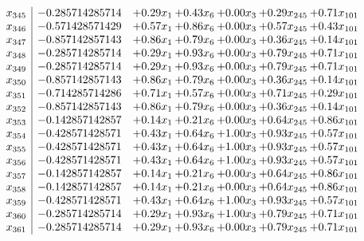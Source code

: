 \documentclass[8pt]{article}
\begin{document}
\[\begin{array}{c| c c@{\hskip 2pt} c@{\hskip 2pt} c@{\hskip 2pt} c@{\hskip 2pt} c@{\hskip 2pt} }
 x_{345}   &  -0.285714285714 & +  0.29 x_{1} & +  0.43 x_{6} & +  0.00 x_{3} & +  0.29 x_{245} & +  0.71 x_{101}\\
 x_{346}   &  -0.571428571429 & +  0.57 x_{1} & +  0.86 x_{6} & +  0.00 x_{3} & +  0.57 x_{245} & +  0.43 x_{101}\\
 x_{347}   &  -0.857142857143 & +  0.86 x_{1} & +  0.79 x_{6} & +  0.00 x_{3} & +  0.36 x_{245} & +  0.14 x_{101}\\
 x_{348}   &  -0.285714285714 & +  0.29 x_{1} & +  0.93 x_{6} & +  0.00 x_{3} & +  0.79 x_{245} & +  0.71 x_{101}\\
 x_{349}   &  -0.285714285714 & +  0.29 x_{1} & +  0.93 x_{6} & +  0.00 x_{3} & +  0.79 x_{245} & +  0.71 x_{101}\\
 x_{350}   &  -0.857142857143 & +  0.86 x_{1} & +  0.79 x_{6} & +  0.00 x_{3} & +  0.36 x_{245} & +  0.14 x_{101}\\
 x_{351}   &  -0.714285714286 & +  0.71 x_{1} & +  0.57 x_{6} & +  0.00 x_{3} & +  0.71 x_{245} & +  0.29 x_{101}\\
 x_{352}   &  -0.857142857143 & +  0.86 x_{1} & +  0.79 x_{6} & +  0.00 x_{3} & +  0.36 x_{245} & +  0.14 x_{101}\\
 x_{353}   &  -0.142857142857 & +  0.14 x_{1} & +  0.21 x_{6} & +  0.00 x_{3} & +  0.64 x_{245} & +  0.86 x_{101}\\
 x_{354}   &  -0.428571428571 & +  0.43 x_{1} & +  0.64 x_{6} & +  1.00 x_{3} & +  0.93 x_{245} & +  0.57 x_{101}\\
 x_{355}   &  -0.428571428571 & +  0.43 x_{1} & +  0.64 x_{6} & +  1.00 x_{3} & +  0.93 x_{245} & +  0.57 x_{101}\\
 x_{356}   &  -0.428571428571 & +  0.43 x_{1} & +  0.64 x_{6} & +  1.00 x_{3} & +  0.93 x_{245} & +  0.57 x_{101}\\
 x_{357}   &  -0.142857142857 & +  0.14 x_{1} & +  0.21 x_{6} & +  0.00 x_{3} & +  0.64 x_{245} & +  0.86 x_{101}\\
 x_{358}   &  -0.142857142857 & +  0.14 x_{1} & +  0.21 x_{6} & +  0.00 x_{3} & +  0.64 x_{245} & +  0.86 x_{101}\\
 x_{359}   &  -0.428571428571 & +  0.43 x_{1} & +  0.64 x_{6} & +  1.00 x_{3} & +  0.93 x_{245} & +  0.57 x_{101}\\
 x_{360}   &  -0.285714285714 & +  0.29 x_{1} & +  0.93 x_{6} & +  1.00 x_{3} & +  0.79 x_{245} & +  0.71 x_{101}\\
 x_{361}   &  -0.285714285714 & +  0.29 x_{1} & +  0.93 x_{6} & +  0.00 x_{3} & +  0.79 x_{245} & +  0.71 x_{101}\\

\end{array}\]
\end{document}
